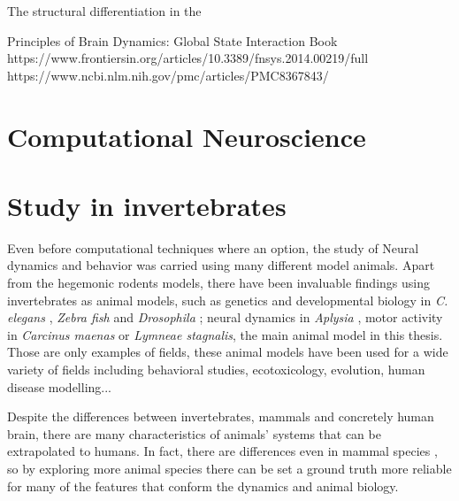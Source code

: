 The structural differentiation in the 




Principles of Brain Dynamics: Global State Interaction Book
https://www.frontiersin.org/articles/10.3389/fnsys.2014.00219/full
https://www.ncbi.nlm.nih.gov/pmc/articles/PMC8367843/


\section{Computational Neuroscience}
\section{Study in invertebrates}
Even before computational techniques where an option, the study of Neural dynamics and behavior was carried using many different model animals. Apart from the hegemonic rodents models, there have been invaluable findings using invertebrates as animal models, such as genetics and developmental biology in \textit{C. elegans} \cite{brenner_genetics_1974}, \textit{Zebra fish} \cite{streisinger_production_1981} and \textit{Drosophila} \cite{nusslein-volhard_mutations_1980}; neural dynamics in \textit{Aplysia} \cite{HODGKIN1952,wachtel_direct_1967}, motor activity in \textit{Carcinus maenas} \cite{eisen} or \textit{Lymneae stagnalis}, the main animal model in this thesis. Those are only examples of fields, these animal models have been used for a wide variety of fields including behavioral studies, ecotoxicology, evolution, human disease modelling... \cite{romanova_animal_2018} 

Despite the differences between invertebrates, mammals and concretely human brain, there are many characteristics of animals' systems that can be extrapolated to humans. In fact, there are differences even in mammal species \cite{preuss}, so by exploring more animal species there can be set a ground truth more reliable for many of the features that conform the dynamics and animal biology. 

